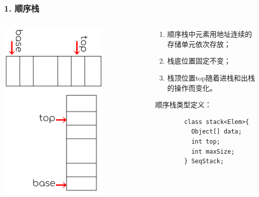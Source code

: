 \begin{frame}[fragile]
  \frametitle{1. 顺序栈}
  \begin{columns}
    \begin{column}[T]{0.5\linewidth}
      \includegraphics[width=0.7\textwidth]{figs/stack/seq-stack.png}
    \end{column}
    \begin{column}[T]{0.5\linewidth}
      \begin{enumerate}
      \item 顺序栈中元素用地址连续的存储单元依次存放；
      \item 栈底位置固定不变；
      \item 栈顶位置top随着进栈和出栈的操作而变化。
      \end{enumerate}

      顺序栈类型定义：

      \begin{verbatim}
        class stack<Elem>{
          Object[] data;
          int top;
          int maxSize;
        } SeqStack;
      \end{verbatim}
    \end{column}
  \end{columns}
\end{frame}

